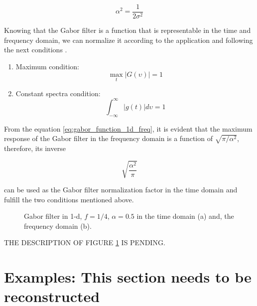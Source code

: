 \begin{equation}\label{eq:gabor_spread_1d}
    \alpha^2 = \frac{1}{2 \sigma^{2} }
\end{equation}

Knowing that the Gabor filter is a function that is representable in the time and frequency domain, we can normalize it according to the application and following the next conditions \cite{Boukerroui.Noble.ea:JMIV:2004}.

\begin{enumerate}
    \item Maximum condition:
        \begin{equation}\label{eq:maximun_condition}
            \max_t{|G(\upsilon)|} = 1
        \end{equation}
    \item Constant spectra condition:
        \begin{equation}\label{eq:constant_energy_condition}
            \int_{-\infty}^{\infty} |g(t)| d\upsilon = 1
        \end{equation}        
\end{enumerate}

From the equation \eqref{eq:gabor_function_1d_freq}, it is evident that the maximum response of the Gabor filter in the frequency domain is a function of $\sqrt{\pi/\alpha^2}$, therefore, its inverse

\begin{equation}\label{eq:normalization_factor}
    \sqrt{\frac{\alpha^2}{\pi}}
\end{equation}

can be used as the Gabor filter normalization factor in the time domain and fulfill the two conditions mentioned above. 

\begin{figure}
	\centering
\caption{Gabor filter in 1-d, $f =1/4$, $\alpha=0.5$ in the time domain (a) and, the frequency domain (b).}\label{fig:Gabor_filter_time_freq_norm}
\end{figure}

THE DESCRIPTION OF FIGURE \ref{fig:Gabor_filter_time_freq_norm} IS PENDING.

\section{Examples: This section needs to be reconstructed}

